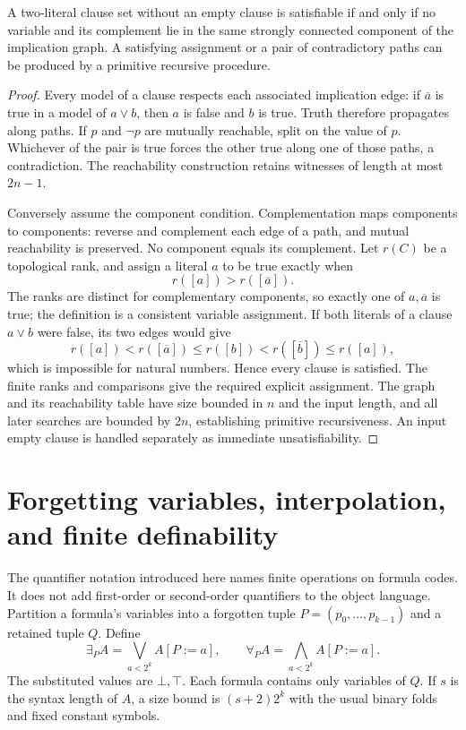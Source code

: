 \begin{theorem}\label{ca-twosat}
A two-literal clause set without an empty clause is satisfiable if and only
if no variable and its complement lie in the same strongly connected
component of the implication graph.  A satisfying assignment or a pair of
contradictory paths can be produced by a primitive recursive procedure.
\end{theorem}
\begin{proof}
Every model of a clause respects each associated implication edge: if
$\overline a$ is true in a model of $a\vee b$, then $a$ is false and $b$
is true.  Truth therefore propagates along paths.  If $p$ and $\neg p$ are
mutually reachable, split on the value of $p$.  Whichever of the pair is
true forces the other true along one of those paths, a contradiction.  The
reachability construction retains witnesses of length at most $2n-1$.

Conversely assume the component condition.  Complementation maps components
to components: reverse and complement each edge of a path, and mutual
reachability is preserved.  No component equals its complement.  Let $r(C)$
be a topological rank, and assign a literal $a$ to be true exactly when
\[
 r([a])>r([\overline a]).
\]
The ranks are distinct for complementary components, so exactly one of
$a,\overline a$ is true; the definition is a consistent variable assignment.
If both literals of a clause $a\vee b$ were false, its two edges would give
\[
 r([a])<r([\overline a])\leq r([b])
       <r([\overline b])\leq r([a]),
\]
which is impossible for natural numbers.  Hence every clause is satisfied.
The finite ranks and comparisons give the required explicit assignment.
The graph and its reachability table have size bounded in $n$ and the input
length, and all later searches are bounded by $2n$, establishing primitive
recursiveness.  An input empty clause is handled separately as immediate
unsatisfiability.
\end{proof}

\section{Forgetting variables, interpolation, and finite definability}
\label{ca-interpolation}

The quantifier notation introduced here names finite operations on formula
codes.  It does not add first-order or second-order quantifiers to the object
language.  Partition a formula's variables into a forgotten tuple
$P=(p_0,\ldots,p_{k-1})$ and a retained tuple $Q$.  Define
\[
 \exists_P A=\bigvee_{a<2^k} A[P:=a],
 \qquad
 \forall_P A=\bigwedge_{a<2^k} A[P:=a].
\]
The substituted values are $\bot,\top$.  Each formula contains only variables
of $Q$.  If $s$ is the syntax length of $A$, a size bound is
$(s+2)2^k$ with the usual binary folds and fixed constant symbols.

